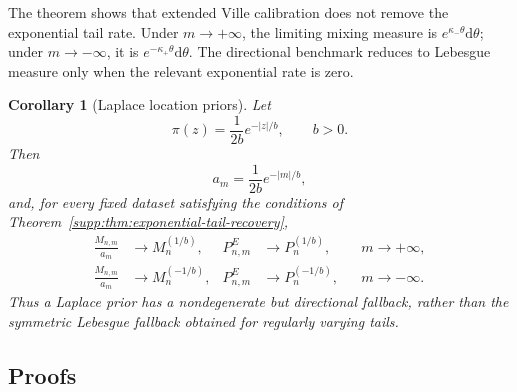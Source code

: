 \documentclass[numsec,webpdf,modern,medium,namedate]{oup-authoring-template}
\theoremstyle{thmstyleone}
\newtheorem{corollary}[theorem]{Corollary}
\theoremstyle{thmstyletwo}
\newcommand{\dd}{\mathrm{d}}
\begin{document}
The theorem shows that extended Ville calibration does not remove the
exponential tail rate.  Under $m\to+\infty$, the limiting mixing
measure is $e^{\kappa_-\theta}\dd\theta$; under $m\to-\infty$, it is
$e^{-\kappa_+\theta}\dd\theta$.  The directional benchmark reduces to
Lebesgue measure only when the relevant exponential rate is zero.

\begin{corollary}[Laplace location priors]
\label{supp:cor:laplace}
Let
\begin{equation}
\label{supp:eq:laplace-density}
  \pi(z)
  =
  \frac{1}{2b}e^{-|z|/b},
  \qquad b>0.
\end{equation}
Then
\begin{equation}
\label{supp:eq:laplace-scale}
  a_m
  =
  \frac{1}{2b}e^{-|m|/b},
\end{equation}
and, for every fixed dataset satisfying the conditions of
Theorem~\ref{supp:thm:exponential-tail-recovery},
\begin{align}
  \frac{M_{n,m}}{a_m}
  &\longrightarrow M_n^{(1/b)},
  &
  P_{n,m}^{E}
  &\longrightarrow P_n^{(1/b)},
  &&m\to+\infty,
  \label{supp:eq:laplace-positive-limit}\\
  \frac{M_{n,m}}{a_m}
  &\longrightarrow M_n^{(-1/b)},
  &
  P_{n,m}^{E}
  &\longrightarrow P_n^{(-1/b)},
  &&m\to-\infty.
  \label{supp:eq:laplace-negative-limit}
\end{align}
Thus a Laplace prior has a nondegenerate but directional fallback,
rather than the symmetric Lebesgue fallback obtained for regularly
varying tails.
\end{corollary}

\subsection{Proofs}
\label{supp:subsec:proofs}
\end{document}

